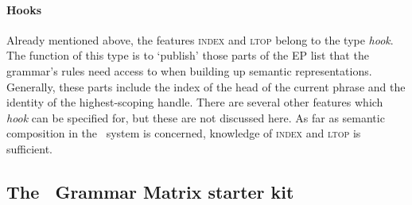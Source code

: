 \paragraph{Hooks}

Already mentioned above, the features \textsc{index} and \textsc{ltop} belong
to the type \emph{hook}. The function of this type is to `publish' those parts
of the EP list that the grammar's rules need access to when building up
semantic representations. Generally, these parts include the index of the head of the current phrase and the identity of the highest-scoping handle. There are several other features which \emph{hook} can be specified for, but these are not discussed here. As far as semantic composition in the \depicto\ system is concerned, knowledge of \textsc{index} and \textsc{ltop} is sufficient.


\subsection{The \lingo\ Grammar Matrix starter kit}
\label{sub:lingomatrix}

